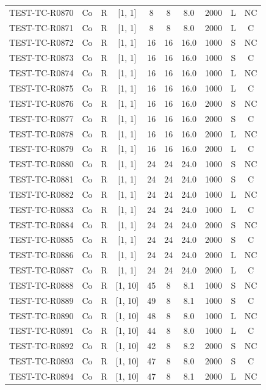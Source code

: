\begin{longtable}{lccccccccc}
TEST-TC-R0870 & Co & R & [1, 1] & 8 & 8 & 8.0 & 2000 & L & NC \\
TEST-TC-R0871 & Co & R & [1, 1] & 8 & 8 & 8.0 & 2000 & L & C \\
TEST-TC-R0872 & Co & R & [1, 1] & 16 & 16 & 16.0 & 1000 & S & NC \\
TEST-TC-R0873 & Co & R & [1, 1] & 16 & 16 & 16.0 & 1000 & S & C \\
TEST-TC-R0874 & Co & R & [1, 1] & 16 & 16 & 16.0 & 1000 & L & NC \\
TEST-TC-R0875 & Co & R & [1, 1] & 16 & 16 & 16.0 & 1000 & L & C \\
TEST-TC-R0876 & Co & R & [1, 1] & 16 & 16 & 16.0 & 2000 & S & NC \\
TEST-TC-R0877 & Co & R & [1, 1] & 16 & 16 & 16.0 & 2000 & S & C \\
TEST-TC-R0878 & Co & R & [1, 1] & 16 & 16 & 16.0 & 2000 & L & NC \\
TEST-TC-R0879 & Co & R & [1, 1] & 16 & 16 & 16.0 & 2000 & L & C \\
TEST-TC-R0880 & Co & R & [1, 1] & 24 & 24 & 24.0 & 1000 & S & NC \\
TEST-TC-R0881 & Co & R & [1, 1] & 24 & 24 & 24.0 & 1000 & S & C \\
TEST-TC-R0882 & Co & R & [1, 1] & 24 & 24 & 24.0 & 1000 & L & NC \\
TEST-TC-R0883 & Co & R & [1, 1] & 24 & 24 & 24.0 & 1000 & L & C \\
TEST-TC-R0884 & Co & R & [1, 1] & 24 & 24 & 24.0 & 2000 & S & NC \\
TEST-TC-R0885 & Co & R & [1, 1] & 24 & 24 & 24.0 & 2000 & S & C \\
TEST-TC-R0886 & Co & R & [1, 1] & 24 & 24 & 24.0 & 2000 & L & NC \\
TEST-TC-R0887 & Co & R & [1, 1] & 24 & 24 & 24.0 & 2000 & L & C \\
TEST-TC-R0888 & Co & R & [1, 10] & 45 & 8 & 8.1 & 1000 & S & NC \\
TEST-TC-R0889 & Co & R & [1, 10] & 49 & 8 & 8.1 & 1000 & S & C \\
TEST-TC-R0890 & Co & R & [1, 10] & 48 & 8 & 8.0 & 1000 & L & NC \\
TEST-TC-R0891 & Co & R & [1, 10] & 44 & 8 & 8.0 & 1000 & L & C \\
TEST-TC-R0892 & Co & R & [1, 10] & 42 & 8 & 8.2 & 2000 & S & NC \\
TEST-TC-R0893 & Co & R & [1, 10] & 47 & 8 & 8.0 & 2000 & S & C \\
TEST-TC-R0894 & Co & R & [1, 10] & 47 & 8 & 8.1 & 2000 & L & NC \\

\end{longtable}

